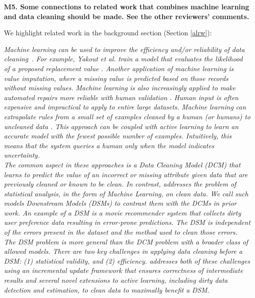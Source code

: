 \vspace{0.5em}

\noindent\textbf{M5. Some connections to related work that combines machine learning and data cleaning should be made. See the other reviewers' comments.}

We highlight related work in the background section (Section \ref{alrw}):

\emph{Machine learning can be used to improve the efficiency and/or reliability of data cleaning~\cite{yakout2013don,gokhale2014corleone}.
For example, Yakout et al. train a model that evaluates the likelihood of a proposed replacement value \cite{yakout2013don}.
Another application of machine learning is value imputation, where a missing value is predicted based on those records without missing values.
Machine learning is also increasingly applied to make automated repairs more reliable with human validation \cite{DBLP:journals/pvldb/YakoutENOI11}.
Human input is often expensive and impractical to apply to entire large datasets.
Machine learning can extrapolate rules from a small set of examples cleaned by a human (or humans) to uncleaned data \cite{gokhale2014corleone, DBLP:journals/pvldb/YakoutENOI11}.
This approach can be coupled with active learning \cite{DBLP:journals/pvldb/MozafariSFJM14} to learn an accurate model with the fewest possible number of examples.
Intuitively, this means that the system queries a human only when the model indicates uncertainty.\\
The common aspect in these approaches is a Data Cleaning Model (DCM) that learns to predict the value of an incorrect or missing attribute given data that are previously cleaned or known to be clean.
In contrast, \sys addresses the problem of statistical analysis, in the form of Machine Learning, on clean data.
We call such models Downstream Models (DSMs) to contrast them with the DCMs in prior work.
An example of a DSM is a movie recommender system that collects dirty user preference data resulting in error-prone predictions.
The DSM is independent of the errors present in the dataset and the method used to clean those errors.
The DSM problem is more general than the DCM problem with a broader class of allowed models.
There are two key challenges in applying data cleaning before a DSM: (1) statistical validity, and (2) efficiency. 
\sys addresses both of these challenges using an incremental update framework that ensures correctness of intermediate results and several novel extensions to active learning, including dirty data detection and estimation, to clean data to maximally benefit a DSM.}

